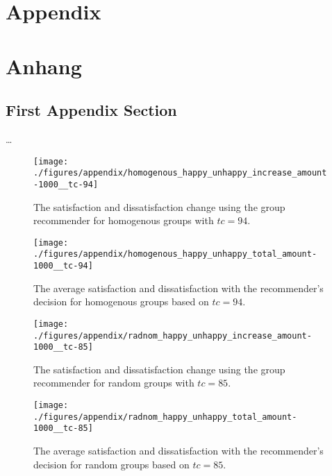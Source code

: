 {\chapter{Appendix}}    %
{\chapter{Anhang}}      %
\label{chap:appendix}


\section{First Appendix Section}
\label{sec:appendix:FirstSection}
		
\setcounter{figure}{0}


\dots


\begin{figure}
    \centering
    \texttt{[image: ./figures/appendix/homogenous\_happy\_unhappy\_increase\_amount-1000\_\_tc-94]}
    \caption{The satisfaction and dissatisfaction change using the group recommender for homogenous groups with $tc = 94$.}
    \label{fig:Appendix:HomoSatisfactionIncrease}
\end{figure}

\begin{figure}
    \centering
    \texttt{[image: ./figures/appendix/homogenous\_happy\_unhappy\_total\_amount-1000\_\_tc-94]}
    \caption{The average satisfaction and dissatisfaction with the recommender's decision for homogenous groups based on $tc = 94$.}
    \label{fig:Appendix:HomoSatisfactionTotal}
\end{figure}

\begin{figure}
    \centering
    \texttt{[image: ./figures/appendix/radnom\_happy\_unhappy\_increase\_amount-1000\_\_tc-85]}
    \caption{The satisfaction and dissatisfaction change using the group recommender for random groups with $tc = 85$.}
    \label{fig:Appendix:RandomSatisfactionIncrease}
\end{figure}

\begin{figure}
    \centering
    \texttt{[image: ./figures/appendix/radnom\_happy\_unhappy\_total\_amount-1000\_\_tc-85]}
    \caption{The average satisfaction and dissatisfaction with the recommender's decision for random groups based on $tc = 85$.}
    \label{fig:Appendix:RandomSatisfactionTotal}
\end{figure}